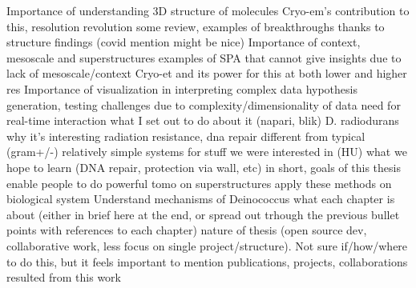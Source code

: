 \begin{outline}
\1 Importance of understanding 3D structure of molecules
    \2 Cryo-em's contribution to this, resolution revolution
    \2 some review, examples of breakthroughs thanks to structure findings (covid mention might be nice)
\1 Importance of context, mesoscale and superstructures
    \2 examples of SPA that cannot give insights due to lack of mesoscale/context
    \2 Cryo-et and its power for this at both lower and higher res
\1 Importance of visualization in interpreting complex data
    \2 hypothesis generation, testing
    \2 challenges due to complexity/dimensionality of data
    \2 need for real-time interaction
    \2 what I set out to do about it (napari, blik)
\1 D. radiodurans
    \2 why it's interesting
        \3 radiation resistance, dna repair
        \3 different from typical (gram+/-)
        \3 relatively simple systems for stuff we were interested in (HU)
    \2 what we hope to learn (DNA repair, protection via wall, etc)
\1 in short, goals of this thesis
    \2 enable people to do powerful tomo on superstructures
    \2 apply these methods on biological system
    \2 Understand mechanisms of Deinococcus
\1 what each chapter is about (either in brief here at the end, or spread out trhough the previous bullet points with references to each chapter)
\1 nature of thesis (open source dev, collaborative work, less focus on single project/structure). Not sure if/how/where to do this, but it feels important to mention
\1 publications, projects, collaborations resulted from this work
\end{outline}
